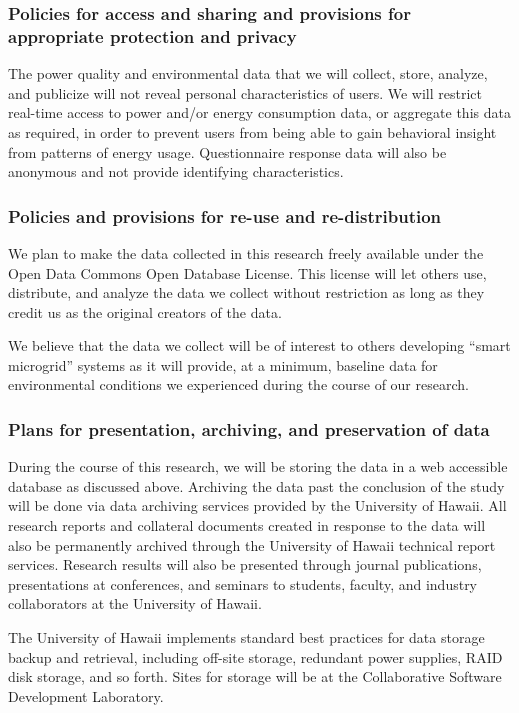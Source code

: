 \subsubsection*{Policies for access and sharing and provisions for appropriate protection and privacy}

The power quality and environmental data that we will collect, store, analyze, and publicize will not reveal personal characteristics of users. We will restrict real-time access to power and/or energy consumption data, or aggregate this data as required, in order to prevent users from being able to gain behavioral insight from patterns of energy usage.  Questionnaire response data will also be anonymous and not provide identifying characteristics.

\subsubsection*{Policies and provisions for re-use and re-distribution}

We plan to make the data collected in this research freely available under the Open Data Commons Open Database License. This license will let others use, distribute, and analyze the data we collect without restriction as long as they credit us as the original creators of the data.

We believe that the data we collect will be of interest to others developing ``smart microgrid'' systems as it will provide, at a minimum, baseline data for environmental conditions we experienced during the course of our research.

\subsubsection*{Plans for presentation, archiving, and preservation of data}

During the course of this research, we will be storing the data in a web accessible database as discussed above. Archiving the data past the conclusion of the study will be done via data archiving services provided by the University of Hawaii. All research reports and collateral documents created in response to the data will also be permanently archived through the University of Hawaii technical report services.   Research results will also be presented through journal publications, presentations at conferences, and seminars to students, faculty, and industry collaborators at the University of Hawaii.

The University of Hawaii implements standard best practices for data storage backup and retrieval, including off-site storage, redundant power supplies, RAID disk storage, and so forth.  Sites for storage will be at the Collaborative Software Development Laboratory. 

